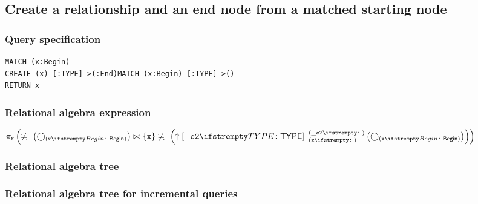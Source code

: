 \subsection{Create a relationship and an end node from a matched starting node}

\subsubsection*{Query specification}

\begin{lstlisting}
MATCH (x:Begin)
CREATE (x)-[:TYPE]->(:End)MATCH (x:Begin)-[:TYPE]->()
RETURN x
\end{lstlisting}

\subsubsection*{Relational algebra expression}

$\projection{\var{x}} \left(\alldifferent{} \left(\getvertices{x}{Begin}\right) \join \{\var{x}\} \alldifferent{} \left(\expandout{\_e2}{TYPE}{x}{\_e2}{} \left(\getvertices{x}{Begin}\right)\right)\right)$

\subsubsection*{Relational algebra tree}


\subsubsection*{Relational algebra tree for incremental queries}

